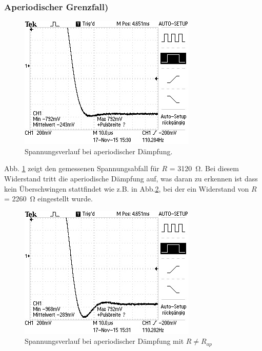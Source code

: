 \subsubsection{Aperiodischer Grenzfall)}
\begin{figure}
  \centering
  \includegraphics[width=\textwidth]{data/F0001TEK.jpg}
  \caption{Spannungsverlauf bei aperiodischer Dämpfung.}
  \label{fig:5bergebnis}
\end{figure}

Abb. \ref{fig:5bergebnis} zeigt den gemessenen Spannungsabfall für
$R$ = \SI{3120}{\ohm}.
Bei diesem Widerstand tritt die aperiodische Dämpfung auf, was daran zu erkennen
ist dass kein Überschwingen stattfindet wie z.B. in Abb.\ref{fig:über}, bei
der ein Widerstand von $R$ = \SI{2260}{\ohm} eingestellt wurde.
\begin{figure}
  \centering
  \includegraphics{data/F0002TEK.jpg}
  \caption{Spannungsverlauf bei aperiodischer Dämpfung mit $R \neq R_{ap}$}
  \label{fig:über}
\end{figure}

